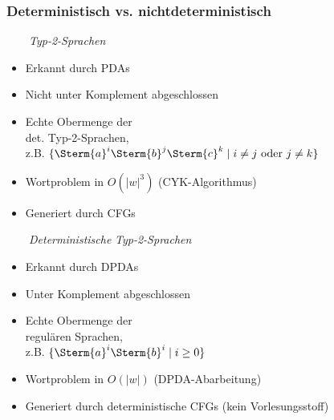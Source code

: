 \documentclass[aspectratio=1610,onlymath]{beamer}
\begin{document}
\begin{frame}\frametitle{Deterministisch vs. nichtdeterministisch}

\begin{minipage}[t]{5.7cm}
~~~~\emph{Typ-2-Sprachen}\\
\begin{itemize}
\item Erkannt durch PDAs
\item Nicht unter Komplement abgeschlossen
\item Echte Obermenge der\\ det. Typ-2-Sprachen,\\ z.B. $\{\Sterm{a}^i\Sterm{b}^j\Sterm{c}^k\mid i\neq j \text{ oder }j\neq k\}$
\item Wortproblem in $O(|w|^3)$ (CYK-Algorithmus)
\item Generiert durch CFGs
\end{itemize}
\end{minipage}
\begin{minipage}[t]{5.7cm}
~~~~\emph{Deterministische} %
\emph{Typ-2-Sprachen}\\
\begin{itemize}
\item Erkannt durch DPDAs
\item Unter Komplement abgeschlossen
\item Echte Obermenge der\\ regulären Sprachen,\\ z.B. $\{\Sterm{a}^i\Sterm{b}^i\mid i\geq 0\}$
\item Wortproblem in $O(|w|)$ (DPDA-Abarbeitung)
\item Generiert durch deterministische CFGs (kein Vorlesungsstoff)
\end{itemize}
\end{minipage}

\end{frame}

\end{document}
